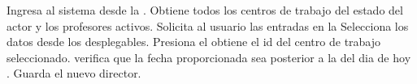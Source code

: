 \begin{UCtrayectoria}
	\UCpaso[\UCactor] Ingresa al sistema desde la .
  \UCpaso Obtiene todos los centros de trabajo del estado del actor y los profesores activos.
	\UCpaso \label{UC5.Datos} Solicita al usuario las entradas en la  
	\UCpaso[\UCactor] Selecciona los datos desde los desplegables.
    \UCpaso[\UCactor] Presiona el 
    \UCpaso obtiene el id del centro de trabajo seleccionado.
    \UCpaso verifica que la fecha proporcionada sea posterior a la del dia de hoy .
    \UCpaso Guarda el nuevo director.
	\
\end{UCtrayectoria}







		
		
		
